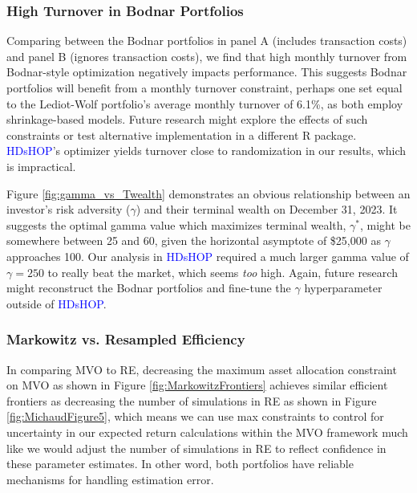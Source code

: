 \documentclass[12pt,letterpaper]{article}
\begin{document}
\subsubsection{High Turnover in Bodnar Portfolios}

Comparing between the Bodnar portfolios in panel A (includes transaction costs) and panel B (ignores transaction costs), we find that high monthly turnover from Bodnar-style optimization negatively impacts performance. This suggests Bodnar portfolios will benefit from a monthly turnover constraint, perhaps one set equal to the Lediot-Wolf portfolio's average monthly turnover of 6.1\%, as both employ shrinkage-based models. Future research might explore the effects of such constraints or test alternative implementation in a different R package. \textcolor{blue}{HDsHOP}'s optimizer yields turnover close to randomization in our results, which is impractical.

Figure \ref{fig:gamma_vs_Twealth} demonstrates an obvious relationship between an investor's risk adversity ($\gamma$) and their terminal wealth on December 31, 2023. It suggests the optimal gamma value which maximizes terminal wealth, $\gamma^{*}$, might be somewhere between 25 and 60, given the horizontal asymptote of \$25,000 as $\gamma$ approaches 100. Our analysis in \textcolor{blue}{HDsHOP} required a much larger gamma value of $\gamma=250$ to really beat the market, which seems \textit{too} high. Again, future research might reconstruct the Bodnar portfolios and fine-tune the $\gamma$ hyperparameter outside of \textcolor{blue}{HDsHOP}.

\subsubsection{Markowitz vs. Resampled Efficiency}

In comparing MVO to RE, decreasing the maximum asset allocation constraint on MVO as shown in Figure \ref{fig:MarkowitzFrontiers} achieves similar efficient frontiers as decreasing the number of simulations in RE as shown in Figure \ref{fig:MichaudFigure5}, which means we can use max constraints to control for uncertainty in our expected return calculations within the MVO framework much like we would adjust the number of simulations in RE to reflect confidence in these parameter estimates. In other word, both portfolios have reliable mechanisms for handling estimation error.
\end{document}
